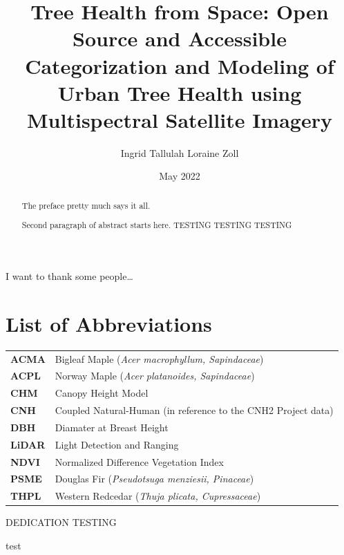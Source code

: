 \documentclass[12pt,twoside]{reedthesis}
\title{Tree Health from Space: Open Source and Accessible Categorization and Modeling of Urban Tree Health using Multispectral Satellite Imagery}
\author{Ingrid Tallulah Loraine Zoll}
\date{May 2022}
\begin{document}
  \maketitle

\frontmatter %
\pagestyle{empty} %
  \begin{acknowledgements}
    I want to thank some people\ldots{}
  \end{acknowledgements}

\chapter*{List of Abbreviations}
\begin{table}[h]
    \centering
    \begin{tabular}{ll}
                \textbf{ACMA} & Bigleaf Maple (\textit{Acer macrophyllum, Sapindaceae}) \\
                \textbf{ACPL} & Norway Maple (\textit{Acer platanoides, Sapindaceae}) \\
                \textbf{CHM} & Canopy Height Model \\
                \textbf{CNH} & Coupled Natural-Human (in reference to the CNH2 Project data) \\
                \textbf{DBH} & Diamater at Breast Height \\
                \textbf{LiDAR} & Light Detection and Ranging \\
                \textbf{NDVI} & Normalized Difference Vegetation Index \\
                \textbf{PSME} & Douglas Fir (\textit{Pseudotsuga menziesii, Pinaceae}) \\
                \textbf{THPL} & Western Redcedar (\textit{Thuja plicata, Cupressaceae}) \\
            \end{tabular}
\end{table}
  \hypersetup{linkcolor=black}
  \setcounter{secnumdepth}{2}
  \setcounter{tocdepth}{2}
  \tableofcontents

  \listoftables

  \listoffigures
  \begin{abstract}
    The preface pretty much says it all.

    \par

    Second paragraph of abstract starts here.
    TESTING TESTING TESTING
  \end{abstract}
  \begin{dedication}
    DEDICATION TESTING

    test
  \end{dedication}
\mainmatter %
\pagestyle{fancyplain} %
\end{document}
